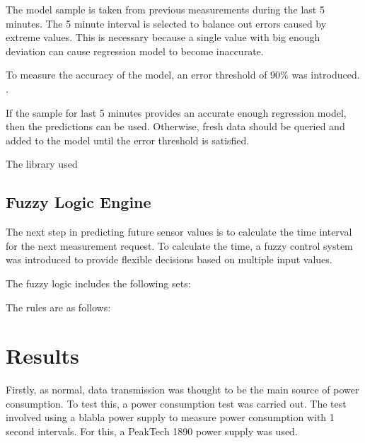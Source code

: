 The model sample is taken from previous measurements during the last  5 minutes. The 5 minute interval is selected to balance out errors caused by extreme values. This is necessary because a single value with big enough deviation can cause regression model to become inaccurate. 

To measure the accuracy of the model, an error threshold of 90\% was introduced. . 

If the sample for last 5 minutes provides an accurate enough regression model, then the predictions can be used. Otherwise, fresh data should be queried and added to the model until the error threshold is satisfied.

The library used 


\subsection{Fuzzy Logic Engine}

The next step in predicting future sensor values is to calculate the time interval for the next measurement request. To calculate the time, a fuzzy control system was introduced to provide flexible decisions based on multiple input values. 

The fuzzy logic includes the following sets:

The rules are as follows:

\section{Results}

Firstly, as normal, data transmission was thought to be the main source of power consumption. To test this, a power consumption test was carried out.
 The test involved using a blabla power supply to measure power consumption with 1 second intervals. For this, a PeakTech 1890 power supply was used.

